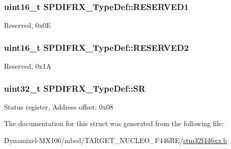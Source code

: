 \subsubsection[{\texorpdfstring{R\+E\+S\+E\+R\+V\+E\+D1}{RESERVED1}}]{\setlength{\rightskip}{0pt plus 5cm}uint16\+\_\+t S\+P\+D\+I\+F\+R\+X\+\_\+\+Type\+Def\+::\+R\+E\+S\+E\+R\+V\+E\+D1}\hypertarget{struct_s_p_d_i_f_r_x___type_def_ad75f5a8de2b69648cc353f190a4b5129}{}\label{struct_s_p_d_i_f_r_x___type_def_ad75f5a8de2b69648cc353f190a4b5129}
Reserved, 0x0E 
\subsubsection[{\texorpdfstring{R\+E\+S\+E\+R\+V\+E\+D2}{RESERVED2}}]{\setlength{\rightskip}{0pt plus 5cm}uint16\+\_\+t S\+P\+D\+I\+F\+R\+X\+\_\+\+Type\+Def\+::\+R\+E\+S\+E\+R\+V\+E\+D2}\hypertarget{struct_s_p_d_i_f_r_x___type_def_a3939647735a72fd528fe3e7f17ed775b}{}\label{struct_s_p_d_i_f_r_x___type_def_a3939647735a72fd528fe3e7f17ed775b}
Reserved, 0x1A 
\subsubsection[{\texorpdfstring{SR}{SR}}]{ uint32\+\_\+t S\+P\+D\+I\+F\+R\+X\+\_\+\+Type\+Def\+::\+SR}\hypertarget{struct_s_p_d_i_f_r_x___type_def_ad3ff338b3b53a2d26d0154b0037e2a20}{}\label{struct_s_p_d_i_f_r_x___type_def_ad3ff338b3b53a2d26d0154b0037e2a20}
Status register, Address offset\+: 0x08 

The documentation for this struct was generated from the following file\+:\begin{DoxyCompactItemize}
\item 
Dynamixel-\/\+M\+X106/mbed/\+T\+A\+R\+G\+E\+T\+\_\+\+N\+U\+C\+L\+E\+O\+\_\+\+F446\+R\+E/\hyperlink{stm32f446xx_8h}{stm32f446xx.\+h}\end{DoxyCompactItemize}
